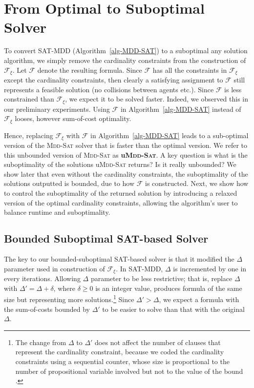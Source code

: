 \documentclass[letterpaper]{article}
\begin{document}
\section{From Optimal to Suboptimal Solver}
To convert SAT-MDD (Algorithm~\ref{alg-MDD-SAT}) to a suboptimal any solution algorithm, we simply remove the cardinality constraints from the construction of $\mathcal{F}_\xi$. 
Let $\mathcal{F}$ denote the resulting formula. 
Since $\mathcal{F}$ has all the constraints in $\mathcal{F}_\xi$ except the cardinality constraints,
then clearly a satisfying assignment to $\mathcal{F}$ still represents a feasible solution (no collisions between agents etc.). Since $\mathcal{F}$ is less constrained than $\mathcal{F}_\xi$, we expect it to be solved faster.
Indeed, we observed this in our preliminary experiments.
Using $\mathcal{F}$ in Algorithm~\ref{alg-MDD-SAT} instead of $\mathcal{F}_\xi$ looses, however sum-of-cost optimality. 


Hence, replacing $\mathcal{F}_\xi$ with $\mathcal{F}$ in Algorithm~\ref{alg-MDD-SAT} leads to a sub-optimal version of the \textsc{Mdd-Sat} solver that is faster than the optimal version. 
We refer to this unbounded version of \textsc{Mdd-Sat} as {\bf u\textsc{Mdd-Sat}}. 
A key question is what is the suboptimality of the solutions u\textsc{Mdd-Sat} returns? Is it really unbounded?
We show later that even without the cardinality constraints, the
suboptimality of the solutions outputted is bounded, due to how $\mathcal{F}$ is constructed. 
Next, we show how to control the suboptimality of the returned solution by introducing a relaxed version of the  optimal cardinality constraints, allowing the algorithm's user to balance runtime and suboptimality. %

\subsection{Bounded Suboptimal SAT-based Solver}

The key to our bounded-suboptimal SAT-based solver is
that it modified the $\Delta$ parameter
used in construction of $\mathcal{F}_\xi$.
In SAT-MDD, $\Delta$ is incremented by one in every iterations.
Allowing $\Delta$ parameter to be less restrictive; that is, replace $\Delta$
with $\Delta'=\Delta+\delta$, where $\delta \geq 0$ is an
integer value, produces formula of the same size but representing more
solutions.\footnote{The change from $\Delta$ to $\Delta'$ does not affect the number of clauses that represent the cardinality constraint, because we coded the cardinality constraints using a sequential counter, whose size is proportional to the number of
propositional variable involved but not to the value of the bound \cite{DBLP:conf/cp/Sinz05}.}
Since $\Delta'>\Delta$, we expect
a formula with the sum-of-costs bounded by $\Delta'$ to be easier to
solve than that with the original $\Delta$.
\end{document}
